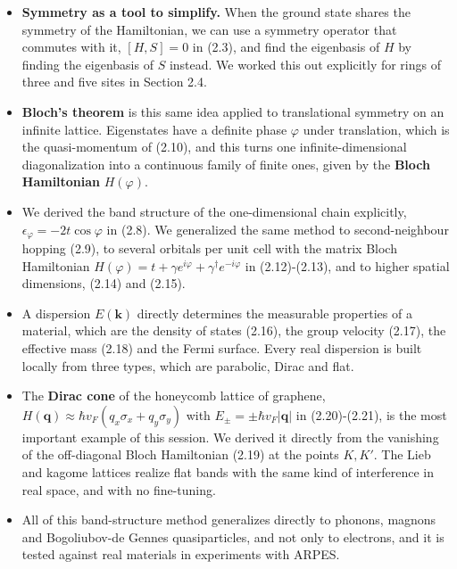 \begin{itemize}
\item \textbf{Symmetry as a tool to simplify.} When the ground state shares the symmetry of the
  Hamiltonian, we can use a symmetry operator that commutes with it, $[H,S]=0$ in (2.3), and find
  the eigenbasis of $H$ by finding the eigenbasis of $S$ instead. We worked this out explicitly for
  rings of three and five sites in Section 2.4.
\item \textbf{Bloch's theorem} is this same idea applied to translational symmetry on an infinite
  lattice. Eigenstates have a definite phase $\varphi$ under translation, which is the quasi-momentum
  of (2.10), and this turns one infinite-dimensional diagonalization into a continuous family of
  finite ones, given by the \textbf{Bloch Hamiltonian} $H(\varphi)$.
\item We derived the band structure of the one-dimensional chain explicitly,
  $\epsilon_\varphi=-2t\cos\varphi$ in (2.8). We generalized the same method to second-neighbour
  hopping (2.9), to several orbitals per unit cell with the matrix Bloch Hamiltonian
  $H(\varphi)=t+\gamma e^{i\varphi}+\gamma^\dagger e^{-i\varphi}$ in (2.12)-(2.13), and to higher spatial dimensions,
  (2.14) and (2.15).
\item A dispersion $E(\mathbf{k})$ directly determines the measurable properties of a material, which
  are the density of states (2.16), the group velocity (2.17), the effective mass (2.18) and the Fermi
  surface. Every real dispersion is built locally from three types, which are parabolic, Dirac and
  flat.
\item The \textbf{Dirac cone} of the honeycomb lattice of graphene, $H(\mathbf{q})\approx\hbar v_F(q_x\sigma_x+
  q_y\sigma_y)$ with $E_\pm=\pm\hbar v_F|\mathbf{q}|$ in (2.20)-(2.21), is the most important example
  of this session. We derived it directly from the vanishing of the off-diagonal Bloch Hamiltonian
  (2.19) at the points $K,K'$. The Lieb and kagome lattices realize flat bands with the same kind of
  interference in real space, and with no fine-tuning.
\item All of this band-structure method generalizes directly to phonons, magnons and Bogoliubov-de
  Gennes quasiparticles, and not only to electrons, and it is tested against real materials in
  experiments with ARPES.
\end{itemize}

